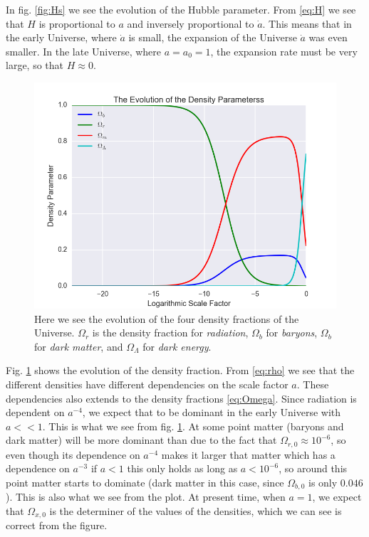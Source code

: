 \documentclass[a4paper,norsk, 10pt]{article}
\begin{document}
In fig. \ref{fig:Hs} we see the evolution of the Hubble parameter. From \eqref{eq:H} we see that $H$ is proportional to $a$ and inversely proportional to $\dot{a}$. This means that in the early Universe, where $\dot{a}$ is small, the expansion of the Universe $\dot{a}$ was even smaller. In the late Universe, where $a = a_0 = 1$, the expansion rate must be very large, so that $H \approx 0$. 


\begin{figure}[ht]
     \centering
	{\includegraphics[scale=0.5]{Omega.png}
	\caption{Here we see the evolution of the four density fractions of the Universe. $\Omega_r$ is the density fraction for \textit{radiation}, $\Omega_b$ for \textit{baryons}, $\Omega_b$ for \textit{dark matter}, and $\Omega_{\Lambda}$ for \textit{dark energy}.}\label{fig:omega}}
\end{figure}


Fig. \ref{fig:omega} shows the evolution of the density fraction. From \ref{eq:rho} we see that the different densities have different dependencies on the scale factor $a$. These dependencies also extends to the density fractions \ref{eq:Omega}. Since radiation is dependent on $a^{-4}$, we expect that to be dominant in the early Universe with $a << 1$. This is what we see from fig. \ref{fig:omega}. At some point matter (baryons and dark matter) will be more dominant than due to the fact that $\Omega_{r,0} \approx 10^{-6}$, so even though its dependence on $a^{-4}$ makes it larger that matter which has a dependence on $a^{-3}$ if $a<1$ this only holds as long as $a < 10^{-6}$, so around this point matter starts to dominate (dark matter in this case, since $\Omega_{b,0}$ is only $0.046$).  This is also what we see from the plot. At present time, when $a=1$, we expect that $\Omega_{x,0}$ is the determiner of the values of the densities, which we can see is correct from the figure.
\end{document}
